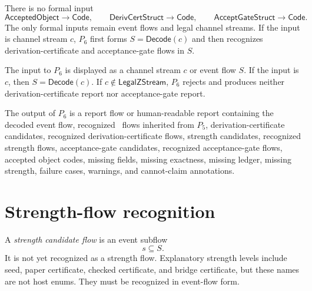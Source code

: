 \begin{principle}
\label{prin:deriv-accept-accepted-object-not-input}
There is no formal input
$$
  \mathsf{AcceptedObject}\to\mathsf{Code},
  \qquad
  \mathsf{DerivCertStruct}\to\mathsf{Code},
  \qquad
  \mathsf{AcceptGateStruct}\to\mathsf{Code}.
$$
The only formal inputs remain event flows and legal channel streams. If the input is channel stream $c$, $P_6$ first forms $S=\mathsf{Decode}(c)$ and then recognizes derivation-certificate and acceptance-gate flows in $S$.
\end{principle}

\begin{definition}[$P_6$ input]
\label{def:deriv-accept-p6-input}
The input to $P_6$ is displayed as a channel stream $c$ or event flow $S$. If the input is $c$, then $S=\mathsf{Decode}(c)$. If $c\notin\mathsf{LegalZStream}$, $P_6$ rejects and produces neither derivation-certificate report nor acceptance-gate report.
\end{definition}

\begin{definition}[$P_6$ output]
\label{def:deriv-accept-p6-output}
The output of $P_6$ is a report flow or human-readable report containing the decoded event flow, recognized \NameCert\ flows inherited from $P_5$, derivation-certificate candidates, recognized derivation-certificate flows, strength candidates, recognized strength flows, acceptance-gate candidates, recognized acceptance-gate flows, accepted object codes, missing fields, missing exactness, missing ledger, missing strength, failure cases, warnings, and cannot-claim annotations.
\end{definition}

\section{Strength-flow recognition}
\label{sec:deriv-accept-strength-recognition}

\begin{definition}
\label{def:deriv-accept-strength-candidate}
A \emph{strength candidate flow} is an event subflow
$$
  s\subseteq S.
$$
It is not yet recognized as a strength flow. Explanatory strength levels include seed, paper certificate, checked certificate, and bridge certificate, but these names are not host enums. They must be recognized in event-flow form.
\end{definition}

